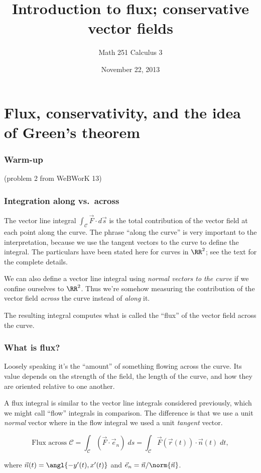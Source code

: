 \documentclass[11pt,ignorenonframetext,aspectratio=169,xcolor={svgnames}]{beamer}
\title{Introduction to flux; conservative vector fields}
\author{Math 251 Calculus 3}
\date{November 22, 2013}
\begin{document}
\frame{\titlepage}

\section{Flux, conservativity, and the idea of Green's theorem}

\begin{frame}\frametitle{Warm-up}

(problem 2 from WeBWorK 13)

\end{frame}

\begin{frame}\frametitle{Integration along vs.~across}

The vector line integral $\int_{\mathcal{C}} \vec{F} \cdot d\vec{s}$ is
the total contribution of the vector field at each point along the
curve. The phrase ``along the curve'' is very important to the
interpretation, because we use the tangent vectors to the curve to
define the integral. The particulars have been stated here for curves in
$\RR^2$; see the text for the complete details.

We can also define a vector line integral using \emph{normal vectors to
the curve} if we confine ourselves to $\RR^2$. Thus we're somehow
measuring the contribution of the vector field \emph{across} the curve
instead of \emph{along} it.

The resulting integral computes what is called the ``flux'' of the
vector field across the curve.

\end{frame}

\begin{frame}\frametitle{What is flux?}

Loosely speaking it's the ``amount'' of something flowing across the
curve. Its value depends on the strength of the field, the length of the
curve, and how they are oriented relative to one another.

A flux integral is similar to the vector line integrals considered
previously, which we might call ``flow'' integrals in comparison. The
difference is that we use a unit \emph{normal} vector where in the flow
integral we used a unit \emph{tangent} vector.

\begin{equation*}
    \text{Flux across $\mathcal{C}$} = \int_{\mathcal{C}} (\vec{F} \cdot \vec{e}_n) \; ds = \int_{\mathcal{C}} \vec{F}(\vec{r}(t)) \cdot \vec{n}(t) \; dt,
\end{equation*}

where $\vec{n}(t) = \angl{-y'(t), x'(t)}$ and
$\vec{e}_n = \vec{n}/\norm{\vec{n}}$.

\end{frame}
\end{document}
